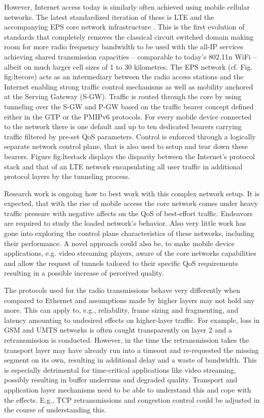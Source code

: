 However, Internet access today is similarly often achieved using mobile cellular networks. The latest standardized iteration of these is LTE and the accompanying EPS core network infrastructure \cite{olsson2009sae}. This is the first evolution of standards that completely removes the classical circuit switched domain making room for more radio frequency bandwidth to be used with the all-IP services achieving shared transmission capacities -- comparable to today's 802.11n WiFi -- albeit on much larger cell sizes of 1 to 30 kilometres. The EPS network (cf. Fig. fig:ltecore) acts as an intermediary between the radio access stations and the Internet enabling strong traffic control mechanisms as well as mobility anchored at the Serving Gateway (S-GW). Traffic is routed through the core by using tunneling over the S-GW and P-GW based on the traffic bearer concept defined either in the GTP or the PMIPv6 protocols. For every mobile device connected to the network there is one default and up to ten dedicated bearers carrying traffic filtered by pre-set QoS parameters. Control is enforced through a logically separate network control plane, that is also used to setup and tear down these bearers. Figure fig:ltestack displays the disparity between the Internet's protocol stack and that of an LTE network encapsulating all user traffic in additional protocol layers by the tunneling process.

Research work is ongoing how to best work with this complex network setup. It is expected, that with the rise of mobile access the core network comes under heavy traffic pressure with negative affects on the QoS of best-effort traffic. Endeavors are required to study the loaded network's behavior. Also very little work has gone into exploring the control plane characteristics of these networks, including their performance. A novel approach could also be, to make mobile device applications, e.g. video streaming players, aware of the core networks capabilities and allow the request of tunnels tailored to their specific QoS requirements resulting in a possible increase of perceived quality.


The protocols used for the radio transmissions behave very differently when compared to Ethernet and assumptions made by higher layers may not hold any more. This can apply to, e.g., reliability, frame sizing and fragmenting, and latency amounting to undesired effects on higher-layer traffic. For example, loss in GSM and UMTS networks is often caught transparently on layer 2 and a retransmission is conducted. However, in the time the retransmission takes the transport layer may have already run into a timeout and re-requested the missing segment on its own, resulting in additional delay and a waste of bandwidth. This is especially detrimental for time-critical applications like video streaming, possibly resulting in buffer underruns and degraded quality. Transport and application layer mechanisms need to be able to understand this and cope with the effects. E.g., TCP retransmissions and congestion control could be adjusted in the course of understanding this.

